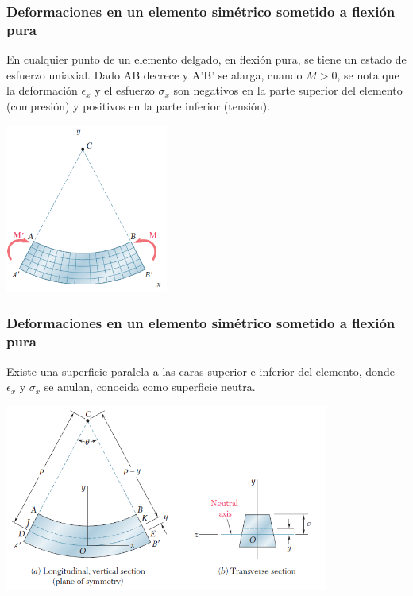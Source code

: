 \documentclass{beamer}
\begin{document}
\begin{frame}
\justifying
\frametitle{Deformaciones en un elemento simétrico sometido a flexión pura}

En cualquier punto de un elemento delgado, en flexión pura, se tiene un estado de esfuerzo 
uniaxial. Dado AB decrece y A'B' se alarga, cuando $M>0$, se nota que la deformación $\epsilon_x$ y 
el esfuerzo $\sigma_x$ son negativos en la parte superior del elemento (compresión) y positivos en la 
parte inferior (tensión).

\begin{center}
\includegraphics[width=0.4\textwidth]{img/longitudinal_section.PNG}
\end{center}
\end{frame}



\begin{frame}
\justifying
\frametitle{Deformaciones en un elemento simétrico sometido a flexión pura}

Existe una superficie paralela a las caras superior e inferior del elemento, donde 
$\epsilon_x$ y $\sigma_x$ se anulan, conocida como superficie neutra.

\begin{center}
\includegraphics[width=0.8\textwidth]{img/deformation_neutral_axis.PNG}
\end{center}
\end{frame}
\end{document}
